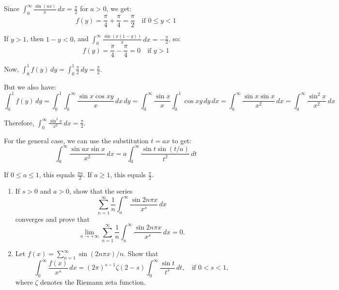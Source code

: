 Since $\int_{0}^{\infty} \frac{\sin(ax)}{x} \, dx = \frac{\pi}{2}$ for $a > 0$, we get:
\[f(y) = \frac{\pi}{4} + \frac{\pi}{4} = \frac{\pi}{2} \quad \text{if } 0 \leq y < 1\]

If $y > 1$, then $1-y < 0$, and $\int_{0}^{\infty} \frac{\sin(x(1-y))}{x} \, dx = -\frac{\pi}{2}$, so:
\[f(y) = \frac{\pi}{4} - \frac{\pi}{4} = 0 \quad \text{if } y > 1\]

Now, $\int_{0}^{1} f(y) \, dy = \int_{0}^{1} \frac{\pi}{2} \, dy = \frac{\pi}{2}$.

But we also have:
\[\int_{0}^{1} f(y) \, dy = \int_{0}^{1} \int_{0}^{\infty} \frac{\sin x \cos xy}{x} \, dx \, dy = \int_{0}^{\infty} \frac{\sin x}{x} \int_{0}^{1} \cos xy \, dy \, dx = \int_{0}^{\infty} \frac{\sin x \sin x}{x^2} \, dx = \int_{0}^{\infty} \frac{\sin^2 x}{x^2} \, dx\]

Therefore, $\int_{0}^{\infty} \frac{\sin^2 x}{x^2} \, dx = \frac{\pi}{2}$.

For the general case, we can use the substitution $t = ax$ to get:
\[\int_{0}^{\infty} \frac{\sin ax \sin x}{x^2} \, dx = a \int_{0}^{\infty} \frac{\sin t \sin(t/a)}{t^2} \, dt\]

If $0 \leq a \leq 1$, this equals $\frac{\pi a}{2}$. If $a \geq 1$, this equals $\frac{\pi}{2}$.

\begin{problembox}
\begin{enumerate}[label=(\alph*)]
    \item If $s > 0$ and $a > 0$, show that the series
    \[\sum_{n=1}^{\infty} \frac{1}{n} \int_{a}^{\infty} \frac{\sin 2n\pi x}{x^{s}} \, dx\]
    converges and prove that
    \[\lim_{a \to +\infty} \sum_{n=1}^{\infty} \frac{1}{n} \int_{a}^{\infty} \frac{\sin 2n\pi x}{x^{s}} \, dx = 0.\]
    \item Let $f(x) = \sum_{n=1}^{\infty} \sin (2n\pi x)/n$. Show that
    \[\int_{0}^{\infty} \frac{f(x)}{x^{s}} \, dx = (2\pi)^{s-1} \zeta (2 - s) \int_{0}^{\infty} \frac{\sin t}{t^{s}} \, dt, \quad \text{if } 0 < s < 1,\]
    where $\zeta$ denotes the Riemann zeta function.
\end{enumerate}
\end{problembox}


